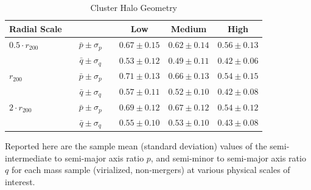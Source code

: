 \begin{table}
\begin{center}
\caption{Cluster Halo Geometry}
\label{table-2}
\begin{tabular}{@{}lcccccc}
\hline
\hline
\textbf{Radial Scale}& & & & \textbf{Low} & \textbf{Medium} & \textbf{High} \\ 
\hline
$0.5 \cdot r_{200}$ & & $\bar{p} \pm \sigma_{p}$ & & $0.67 \pm 0.15$ & $0.62 \pm 0.14$ & $0.56 \pm 0.13$ \\
& & $\bar{q} \pm \sigma_{q}$ & & $0.53 \pm 0.12 $ & $0.49 \pm 0.11$ & $0.42 \pm 0.06$ \\
\hline
$r_{200}$ & & $\bar{p} \pm \sigma_{p}$ & & $0.71 \pm 0.13$ & $0.66 \pm 0.13$ & $0.54 \pm 0.15$ \\
& & $\bar{q} \pm \sigma_{q}$ & & $0.57 \pm 0.11$ & $0.52 \pm 0.10$ & $0.42 \pm 0.08$ \\
\hline
$2 \cdot r_{200}$ & & $\bar{p} \pm \sigma_{p}$ & & $0.69 \pm 0.12$ & $0.67 \pm 0.12$ & $0.54 \pm 0.12$ \\
& & $\bar{q} \pm \sigma_{q}$ & & $0.55 \pm 0.10$ & $0.53 \pm 0.10$ & $0.43 \pm 0.08 $ \\
\hline
\end{tabular}

\medskip
Reported here are the sample mean (standard deviation) values of the
semi-intermediate to semi-major axis ratio $p$, and semi-minor to semi-major
axis ratio $q$ for each mass sample (virialized, non-mergers) at various
physical scales of interest.
\end{center}
\end{table}

